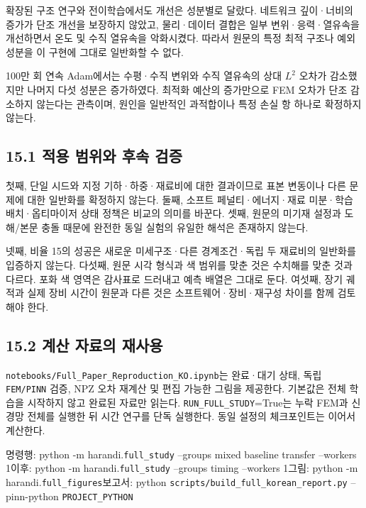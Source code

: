 \documentclass[10pt,a4paper]{article}
\begin{document}
확장된 구조 연구와 전이학습에서도 개선은 성분별로 달랐다. 네트워크 깊이·너비의 증가가 단조 개선을 보장하지 않았고, 물리·데이터 결합은 일부 변위·응력·열유속을 개선하면서 온도 및 수직 열유속을 악화시켰다. 따라서 원문의 특정 최적 구조나 예외 성분을 이 구현에 그대로 일반화할 수 없다.\par

100만 회 연속 Adam에서는 수평·수직 변위와 수직 열유속의 상대 $L^2$ 오차가 감소했지만 나머지 다섯 성분은 증가하였다. 최적화 예산의 증가만으로 FEM 오차가 단조 감소하지 않는다는 관측이며, 원인을 일반적인 과적합이나 특정 손실 항 하나로 확정하지 않는다.\par

\subsection{15.1 적용 범위와 후속 검증}

첫째, 단일 시드와 지정 기하·하중·재료비에 대한 결과이므로 표본 변동이나 다른 문제에 대한 일반화를 확정하지 않는다. 둘째, 소프트 페널티·에너지·재료 미분·학습 배치·옵티마이저 상태 정책은 비교의 의미를 바꾼다. 셋째, 원문의 미기재 설정과 도해/본문 충돌 때문에 완전한 동일 실험의 유일한 해석은 존재하지 않는다.\par

넷째, 비율 15의 성공은 새로운 미세구조·다른 경계조건·독립 두 재료비의 일반화를 입증하지 않는다. 다섯째, 원문 시각 형식과 색 범위를 맞춘 것은 수치해를 맞춘 것과 다르다. 포화 색 영역은 감사표로 드러내고 예측 배열은 그대로 둔다. 여섯째, 장기 궤적과 실제 장비 시간이 원문과 다른 것은 소프트웨어·장비·재구성 차이를 함께 검토해야 한다.\par

\subsection{15.2 계산 자료의 재사용}

\nolinkurl{notebooks/Full_Paper_Reproduction_KO.ipynb}는 완료·대기 상태, 독립 \nolinkurl{FEM/PINN} 검증, NPZ 오차 재계산 및 편집 가능한 그림을 제공한다. 기본값은 전체 학습을 시작하지 않고 완료된 자료만 읽는다. \nolinkurl{RUN_FULL_STUDY}=True는 누락 FEM과 신경망 전체를 실행한 뒤 시간 연구를 단독 실행한다. 동일 설정의 체크포인트는 이어서 계산한다.\par

{\small\color{muted} 명령행: python -m harandi.\nolinkurl{full_study} --groups mixed baseline transfer --workers 1\newline 이후: python -m harandi.\nolinkurl{full_study} --groups timing --workers 1\newline 그림: python -m harandi.\nolinkurl{full_figures}\newline 보고서: python \nolinkurl{scripts/build_full_korean_report.py} --pinn-python \nolinkurl{PROJECT_PYTHON}\par}
\end{document}
